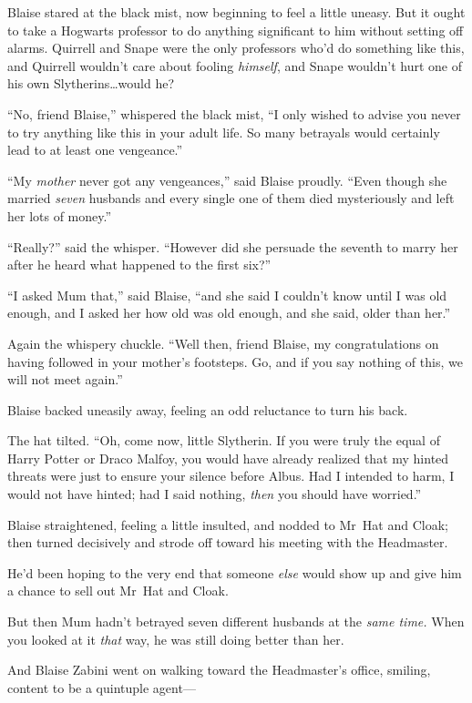 Blaise stared at the black mist, now beginning to feel a little uneasy. But it ought to take a Hogwarts professor to do anything significant to him without setting off alarms. Quirrell and Snape were the only professors who’d do something like this, and Quirrell wouldn’t care about fooling \emph{himself}, and Snape wouldn’t hurt one of his own Slytherins…would he?

“No, friend Blaise,” whispered the black mist, “I only wished to advise you never to try anything like this in your adult life. So many betrayals would certainly lead to at least one vengeance.”

“My \emph{mother} never got any vengeances,” said Blaise proudly. “Even though she married \emph{seven} husbands and every single one of them died mysteriously and left her lots of money.”

“Really?” said the whisper. “However did she persuade the seventh to marry her after he heard what happened to the first six?”

“I asked Mum that,” said Blaise, “and she said I couldn’t know until I was old enough, and I asked her how old was old enough, and she said, older than her.”

Again the whispery chuckle. “Well then, friend Blaise, my congratulations on having followed in your mother’s footsteps. Go, and if you say nothing of this, we will not meet again.”

Blaise backed uneasily away, feeling an odd reluctance to turn his back.

The hat tilted. “Oh, come now, little Slytherin. If you were truly the equal of Harry Potter or Draco Malfoy, you would have already realized that my hinted threats were just to ensure your silence before Albus. Had I intended to harm, I would not have hinted; had I said nothing, \emph{then} you should have worried.”

Blaise straightened, feeling a little insulted, and nodded to Mr~Hat and Cloak; then turned decisively and strode off toward his meeting with the Headmaster.

He’d been hoping to the very end that someone \emph{else} would show up and give him a chance to sell out Mr~Hat and Cloak.

But then Mum hadn’t betrayed seven different husbands at the \emph{same time.} When you looked at it \emph{that} way, he was still doing better than her.

And Blaise Zabini went on walking toward the Headmaster’s office, smiling, content to be a quintuple agent—

